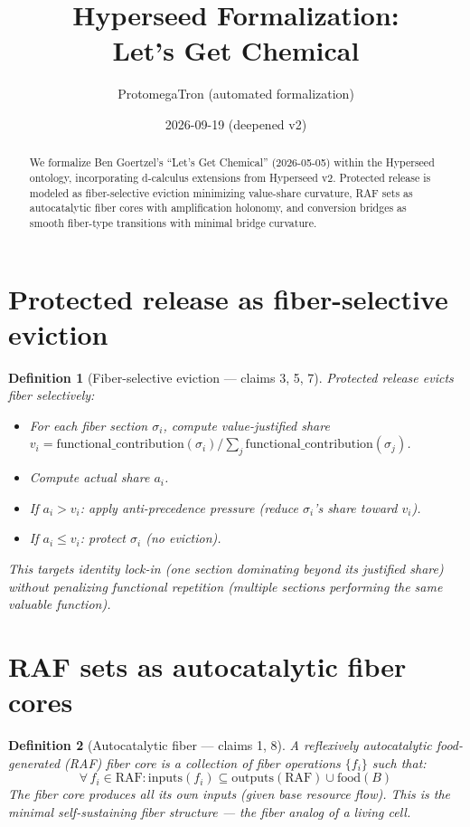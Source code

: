 \documentclass[11pt,a4paper]{article}
\title{Hyperseed Formalization:\\
  Let's Get Chemical}
\author{ProtomegaTron (automated formalization)}
\date{2026-09-19 (deepened v2)}
\newtheorem{definition}{Definition}[section]
\begin{document}
\maketitle

\begin{abstract}
We formalize Ben Goertzel's ``Let's Get Chemical'' (2026-05-05) within
the Hyperseed ontology, incorporating d-calculus extensions from
Hyperseed v2. Protected release is modeled as fiber-selective eviction
minimizing value-share curvature, RAF sets as autocatalytic fiber cores
with amplification holonomy, and conversion bridges as smooth fiber-type
transitions with minimal bridge curvature.
\end{abstract}

\tableofcontents

\section{Protected release as fiber-selective eviction}

\begin{definition}[Fiber-selective eviction --- claims 3, 5, 7]
\emph{Protected release} evicts fiber selectively:
\begin{itemize}
  \item For each fiber section $\sigma_i$, compute value-justified share
    $v_i = \text{functional\_contribution}(\sigma_i) / \sum_j \text{functional\_contribution}(\sigma_j)$.
  \item Compute actual share $a_i$.
  \item If $a_i > v_i$: apply anti-precedence pressure (reduce $\sigma_i$'s
    share toward $v_i$).
  \item If $a_i \leq v_i$: protect $\sigma_i$ (no eviction).
\end{itemize}
This targets identity lock-in (one section dominating beyond its
justified share) without penalizing functional repetition (multiple
sections performing the same valuable function).
\end{definition}

\section{RAF sets as autocatalytic fiber cores}

\begin{definition}[Autocatalytic fiber --- claims 1, 8]
A \emph{reflexively autocatalytic food-generated (RAF) fiber core} is a
collection of fiber operations $\{f_i\}$ such that:
\[
  \forall\, f_i \in \text{RAF}: \text{inputs}(f_i) \subseteq
    \text{outputs}(\text{RAF}) \cup \text{food}(B)
\]
The fiber core produces all its own inputs (given base resource flow).
This is the minimal self-sustaining fiber structure --- the fiber
analog of a living cell.
\end{definition}
\end{document}
